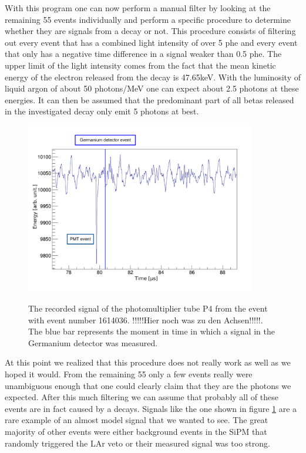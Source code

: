 \documentclass[encoding=utf8,british]{tumphthesis}
\begin{document}
With this program one can now perform a manual filter by looking at the remaining 55 events individually and perform a specific procedure to determine whether they are signals from a \Kr decay or not.
This procedure consists of filtering out every event that has a combined light intensity of over 5 phe and every event that only has a negative time difference in a signal weaker than 0.5 phe.
The upper limit of the light intensity comes from the fact that the mean kinetic energy of the electron released from the decay is 47.65keV. 
With the luminosity of liquid argon of about 50 photons/MeV one can expect about 2.5 photons at these energies. 
It can then be assumed that the predominant part of all betas released in the investigated decay only emit 5 photons at best.
\\

\begin{figure}[t!]
	\centering
	\ifmakefigures%
	\includegraphics[width=100mm]{./Bilder/BeispielSignal.pdf}
	\fi%
	\label{fig:Trigger4}
	\caption{
    The recorded signal of the photomultiplier tube P4 from the event with event number 1614036. !!!!!Hier noch was zu den Achsen!!!!!. 
    The blue bar represents the moment in time in which a signal in the Germanium detector was measured.
	}
\end{figure}

At this point we realized that this procedure does not really work as well as we hoped it would.
From the remaining 55 only a few events really were unambiguous enough that one could clearly claim that they are the photons we expected.
After this much filtering we can assume that probably all of these events are in fact caused by a \Kr decays.
Signals like the one shown in figure \ref{fig:Trigger4} are a rare example of an almost model signal that we wanted to see.
The great majority of other events were either background events in the SiPM that randomly triggered the LAr veto or their measured signal was too strong.  
\\
\end{document}
